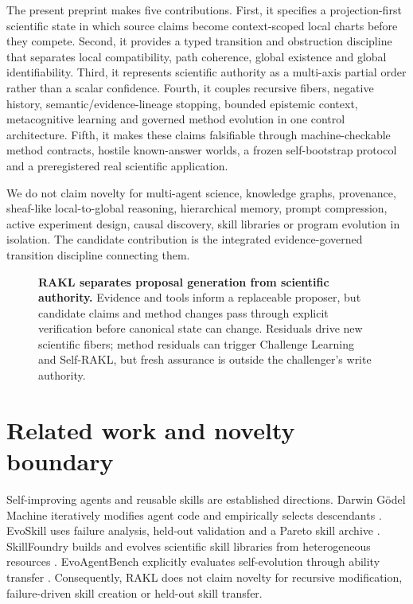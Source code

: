 \documentclass[11pt]{article}
\newcommand{\RAKL}{\textsc{RAKL}}
\begin{document}
The present preprint makes five contributions. First, it specifies a projection-first scientific state in which source claims become context-scoped local charts before they compete. Second, it provides a typed transition and obstruction discipline that separates local compatibility, path coherence, global existence and global identifiability. Third, it represents scientific authority as a multi-axis partial order rather than a scalar confidence. Fourth, it couples recursive fibers, negative history, semantic/evidence-lineage stopping, bounded epistemic context, metacognitive learning and governed method evolution in one control architecture. Fifth, it makes these claims falsifiable through machine-checkable method contracts, hostile known-answer worlds, a frozen self-bootstrap protocol and a preregistered real scientific application.

We do not claim novelty for multi-agent science, knowledge graphs, provenance, sheaf-like local-to-global reasoning, hierarchical memory, prompt compression, active experiment design, causal discovery, skill libraries or program evolution in isolation. The candidate contribution is the integrated evidence-governed transition discipline connecting them.

\begin{figure}[t]
\centering
\resizebox{\textwidth}{!}{}
\caption{\textbf{RAKL separates proposal generation from scientific authority.} Evidence and tools inform a replaceable proposer, but candidate claims and method changes pass through explicit verification before canonical state can change. Residuals drive new scientific fibers; method residuals can trigger Challenge Learning and Self-RAKL, but fresh assurance is outside the challenger's write authority.}
\label{fig:architecture}
\end{figure}

\section{Related work and novelty boundary}
Self-improving agents and reusable skills are established directions. Darwin G\"odel Machine iteratively modifies agent code and empirically selects descendants \citep{zhang2025dgm}. EvoSkill uses failure analysis, held-out validation and a Pareto skill archive \citep{alzubi2026evoskill}. SkillFoundry builds and evolves scientific skill libraries from heterogeneous resources \citep{shen2026skillfoundry}. EvoAgentBench explicitly evaluates self-evolution through ability transfer \citep{gao2026evoagentbench}. Consequently, \RAKL{} does not claim novelty for recursive modification, failure-driven skill creation or held-out skill transfer.
\end{document}
